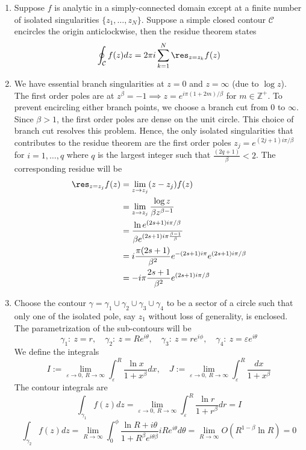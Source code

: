 \documentclass[a4paper]{article}
\begin{document}
\begin{ans}\leavevmode
\begin{enumerate}[label=(\roman*)]
\item 
Suppose $f$ is analytic in a simply-connected domain except at a finite number of isolated singularities $\{z_1,\dots,z_N\}$. Suppose a simple closed contour $\mathcal{C}$ encircles the origin anticlockwise, then the residue theorem states
$$\oint_{\mathcal{C}} f(z)dz=2\pi i\sum_{k=1}^N\res_{z=z_k}f(z)$$
\item We have essential branch singularities at $z=0$ and $z=\infty$ (due to $\log z$). The first order poles are at $z^\beta=-1\implies z=e^{i\pi(1+2m)/\beta}$ for $m\in\mathbb{Z}^+$. To prevent encircling either branch points, we choose a branch cut from 0 to $\infty$. Since $\beta>1$, the first order poles are dense on the unit circle. This choice of branch cut resolves this problem. Hence, the only isolated singularities that contributes to the residue theorem are the first order poles $z_j=e^{(2j+1)i\pi/\beta}$ for $i=1,\dots,q$ where $q$ is the largest integer such that $\frac{(2q+1)}{\beta}<2$. The corresponding residue will be
\begin{align}
\res_{z=z_j}f(z)&=\lim_{z\rightarrow z_j}(z-z_j)f(z)\nonumber\\&=\lim_{z\rightarrow z_j}\frac{\log z}{\beta z^{\beta-1}}\nonumber\\&=\frac{\ln e^{(2s+1)i\pi/\beta}}{\beta e^{(2s+1)i\pi\frac{\beta-1}{\beta}}}\nonumber\\&=i\frac{\pi(2s+1)}{\beta^2}e^{-(2s+1)i\pi}e^{(2s+1)i\pi/\beta}\nonumber\\&=-i\pi\frac{2s+1}{\beta^2}e^{(2s+1)i\pi/\beta}\nonumber
\end{align}
\item Choose the contour $\gamma=\gamma_1\cup\gamma_2\cup\gamma_3\cup\gamma_4$ to be a sector of a circle such that only one of the isolated pole, say $z_1$ without loss of generality, is enclosed. The parametrization of the sub-contours will be
$$\gamma_1:~z=r,\quad\gamma_2:~z=Re^{i\theta},\quad \gamma_3:~z=re^{i\phi},\quad\gamma_4:~z=\varepsilon e^{i\theta}$$
We define the integrals 
$$I:=\lim_{\varepsilon\rightarrow 0,~R\rightarrow\infty}\int_{\varepsilon}^R\frac{\ln x}{1+x^\beta}dx,\quad J:=\lim_{\varepsilon\rightarrow 0,~R\rightarrow\infty}\int_{\varepsilon}^R\frac{dx}{1+x^\beta}$$
The contour integrals are
$$\int_{\gamma_1}f(z)dz=\lim_{\varepsilon\rightarrow 0,~R\rightarrow\infty}\int_{\varepsilon}^R\frac{\ln r}{1+r^\beta}dr=I$$
$$\int_{\gamma_2}f(z)dz=\lim_{R\rightarrow\infty}\int_0^\phi\frac{\ln R+i\theta}{1+R^\beta e^{i\theta\beta}}iRe^{i\theta}d\theta=\lim_{R\rightarrow\infty}O(R^{1-\beta}\ln R)=0$$

\end{enumerate}
\end{ans}
\end{document}
